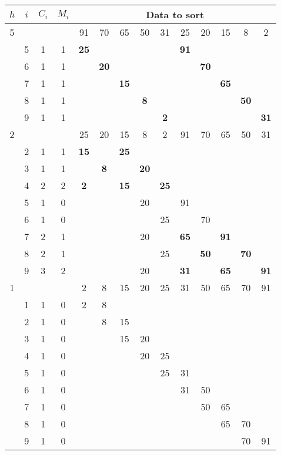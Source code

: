 \documentclass{article}
\begin{document}
\begin{tabular}{|c|c|c|c|c|c|c|c|c|c|c|c|c|c|}
\hline
\(h\)& \(i\)& \(C_i\)& \(M_i\) &\multicolumn{10}{|c|}{\textbf{Data to sort}} \\
\hline
5& \multicolumn{3}{|c|}{}& 91& 70& 65& 50& 31& 25& 20& 15& 8& 2 \\
\cline{2-14}
& 5& 1& 1& \textbf{25}& & & & & \textbf{91}& & & & \\
\cline{2-14}
& 6& 1& 1& & \textbf{20}& & & & & \textbf{70}& & & \\
\cline{2-14}
& 7& 1& 1& & & \textbf{15}& & & & & \textbf{65}& & \\
\cline{2-14}
& 8& 1& 1& & & & \textbf{8}& & & & & \textbf{50}& \\
\cline{2-14}
& 9& 1& 1& & & & & \textbf{2}& & & & & \textbf{31} \\
\hline
2& \multicolumn{3}{|c|}{}& 25& 20& 15& 8& 2& 91& 70& 65& 50& 31 \\
\cline{2-14}
& 2& 1& 1& \textbf{15}& & \textbf{25}& & & & & & & \\
\cline{2-14}
& 3& 1& 1& & \textbf{8}& & \textbf{20}& & & & & & \\
\cline{2-14}
& 4& 2& 2& \textbf{2}& & \textbf{15}& & \textbf{25}& & & & & \\
\cline{2-14}
& 5& 1& 0& & & & 20& & 91& & & & \\
\cline{2-14}
& 6& 1& 0& & & & & 25& & 70& & & \\
\cline{2-14}
& 7& 2& 1& & & & 20& & \textbf{65}& & \textbf{91}& & \\
\cline{2-14}
& 8& 2& 1& & & & & 25& & \textbf{50}& & \textbf{70}& \\
\cline{2-14}
& 9& 3& 2& & & & 20& & \textbf{31}& & \textbf{65}& & \textbf{91} \\
\hline
1& \multicolumn{3}{|c|}{}& 2& 8& 15& 20& 25& 31& 50& 65& 70& 91 \\
\cline{2-14}
& 1& 1& 0& 2& 8& & & & & & & & \\
\cline{2-14}
& 2& 1& 0& & 8& 15& & & & & & & \\
\cline{2-14}
& 3& 1& 0& & & 15& 20& & & & & & \\
\cline{2-14}
& 4& 1& 0& & & & 20& 25& & & & & \\
\cline{2-14}
& 5& 1& 0& & & & & 25& 31& & & & \\
\cline{2-14}
& 6& 1& 0& & & & & & 31& 50& & & \\
\cline{2-14}
& 7& 1& 0& & & & & & & 50& 65& & \\
\cline{2-14}
& 8& 1& 0& & & & & & & & 65& 70& \\
\cline{2-14}
& 9& 1& 0& & & & & & & & & 70& 91\\
\hline
\end{tabular}
\end{document}
